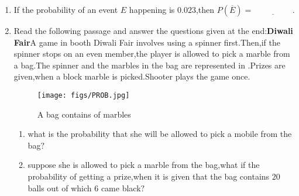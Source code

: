 \begin{enumerate}
\item If the probability of an event $E$ happening is $0.023$,then $P(\overline{E})=\underline{\hspace{2cm}}$.
\item Read the following passage and answer the questions given at the end:\newline\textbf{Diwali Fair}\newline A game in booth Diwali Fair involves using a spinner first.Then,if the spinner stops on an even member,the player is allowed to pick a marble from a bag.The spinner and the marbles in the bag are represented in .\newline Prizes are given,when a block marble is picked.Shooter plays the game once.
\begin{figure}[H]
\centering
\texttt{[image: figs/PROB.jpg]}
\caption{A bag contains of marbles}
\label{fig:PROB.jpg}
\end{figure}
\begin{enumerate}[label=(\roman*)]
\item what is the probability that she will be allowed to pick a mobile from the bag$?$
\item suppose she is allowed to pick a marble from the bag,what if the probability of getting a prize,when it is given that the bag contains $20$ balls out of which $6$ came black$?$
\end{enumerate}
\end{enumerate}